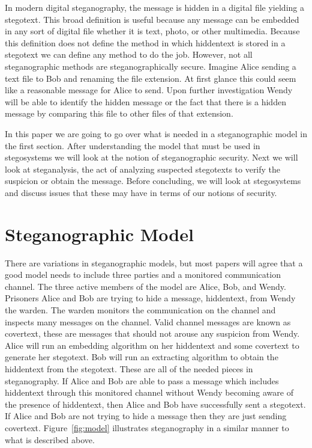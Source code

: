 \documentclass[11pt]{article}
\begin{document}
In modern digital steganography, the message is hidden in a digital
file yielding a stegotext. This broad definition is useful because any
message can be embedded in any sort of digital file whether it is
text, photo, or other multimedia. Because this definition does not
define the method in which hiddentext is stored in a stegotext we can
define any method to do the job. However, not all steganographic
methods are steganographically secure. Imagine Alice sending a text
file to Bob and renaming the file extension. At first glance this
could seem like a reasonable message for Alice to send. Upon further
investigation Wendy will be able to identify the hidden message or the
fact that there is a hidden message by comparing this file to other
files of that extension.

In this paper we are going to go over what is needed in a
steganographic model in the first section. After understanding the
model that must be used in stegosystems we will look at the notion of
steganographic security. Next we will look at steganalysis, the act of
analyzing suspected stegotexts to verify the suspicion or obtain the
message. Before concluding, we will look at stegosystems and discuss
issues that these may have in terms of our notions of security.

\section{Steganographic Model}
There are variations in steganographic models, but most papers will
agree that a good model needs to include three parties and a monitored
communication channel. The three active members of the model are
Alice, Bob, and Wendy. Prisoners Alice and Bob are trying to hide a
message, hiddentext, from Wendy the warden. The warden monitors the
communication on the channel and inspects many messages on the
channel. Valid channel messages are known as covertext, these are
messages that should not arouse any suspicion from Wendy. Alice will
run an embedding algorithm on her hiddentext and some covertext to
generate her stegotext. Bob will run an extracting algorithm to obtain
the hiddentext from the stegotext. These are all of the needed pieces
in steganography. If Alice and Bob are able to pass a message which
includes hiddentext through this monitored channel without Wendy
becoming aware of the presence of hiddentext, then Alice and Bob have
successfully sent a stegotext. If Alice and Bob are not trying to hide
a message then they are just sending covertext. Figure~\ref{fig:model}
illustrates steganography in a similar manner to what is described
above.
\end{document}
